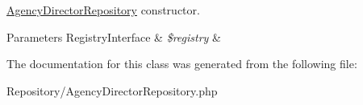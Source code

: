 \mbox{\hyperlink{class_app_1_1_repository_1_1_agency_director_repository}{Agency\+Director\+Repository}} constructor. 
\begin{DoxyParams}[1]{Parameters}
Registry\+Interface & {\em \$registry} & \\
\hline
\end{DoxyParams}


The documentation for this class was generated from the following file\+:\begin{DoxyCompactItemize}
\item 
Repository/Agency\+Director\+Repository.\+php\end{DoxyCompactItemize}
